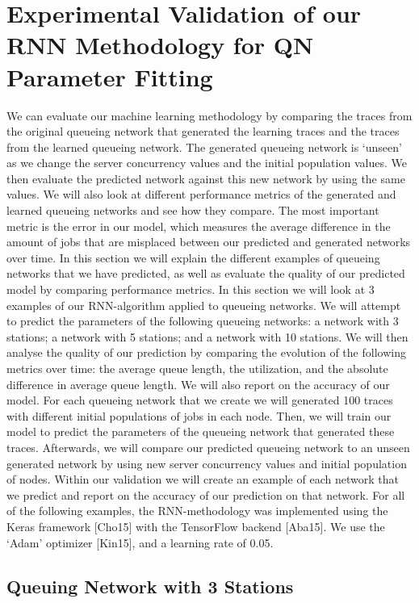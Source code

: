 \documentclass[a4paper,11pt,titlepage]{article}
\begin{document}
\section{Experimental Validation of our RNN Methodology for QN Parameter Fitting}

We can evaluate our machine learning methodology by comparing the traces from the original queueing network that generated the learning traces and the traces from the learned queueing network. The generated queueing network is `unseen' as we change the server concurrency values and the initial population values. We then evaluate the predicted network against this new network by using the same values. We will also look at different performance metrics of the generated and learned queueing networks and see how they compare. The most important metric is the error in our model, which measures the average difference in the amount of jobs that are misplaced between our predicted and generated networks over time. In this section we will explain the different examples of queueing networks that we have predicted, as well as evaluate the quality of our predicted model by comparing performance metrics. In this section we will look at 3 examples of our RNN-algorithm applied to queueing networks. We will attempt to predict the parameters of the following queueing networks: a network with 3 stations; a network with 5 stations; and a network with 10 stations. We will then analyse the quality of our prediction by comparing the evolution of the following metrics over time: the average queue length, the utilization, and the absolute difference in average queue length. We will also report on the accuracy of our model. For each queueing network that we create we will generated 100 traces with different initial populations of jobs in each node. Then, we will train our model to predict the parameters of the queueing network that generated these traces. Afterwards, we will compare our predicted queueing network to an unseen generated network by using new server concurrency values and initial population of nodes. Within our validation we will create an example of each network that we predict and report on the accuracy of our prediction on that network. For all of the following examples, the RNN-methodology was implemented using the Keras framework [Cho15] with the TensorFlow backend [Aba15]. We use the `Adam' optimizer [Kin15], and a learning rate of 0.05.

\subsection{Queuing Network with 3 Stations}
\end{document}
